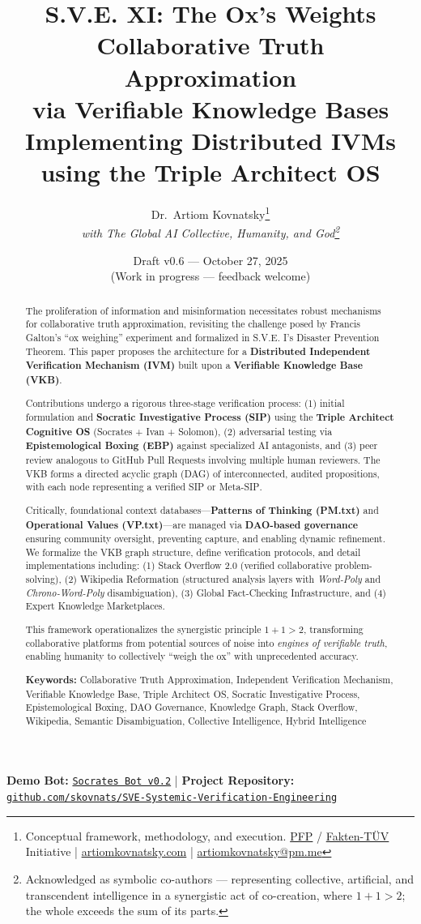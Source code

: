 \documentclass[11pt,a4paper]{article}
\title{\textbf{S.V.E. XI: The Ox's Weights}\\[0.5em]
\Large Collaborative Truth Approximation\\
via Verifiable Knowledge Bases\\[0.5em]
\large Implementing Distributed IVMs using the Triple Architect OS}
\author{
  Dr.\ Artiom Kovnatsky\thanks{Conceptual framework, methodology, and execution. 
  \href{http://www.pfp24.de}{PFP} / 
  \href{http://www.fakten-tuev.de}{Fakten-TÜV} Initiative \;|\;
  \href{https://www.artiomkovnatsky.com/}{artiomkovnatsky.com} \;|\;
  \href{mailto:artiomkovnatsky@pm.me}{artiomkovnatsky@pm.me}}\\
  \textit{with The Global AI Collective, Humanity, and God\footnote{Acknowledged as symbolic co-authors — representing collective, artificial, and transcendent intelligence in a synergistic act of co-creation, where $1 + 1 > 2$; the whole exceeds the sum of its parts.}}
}
\date{Draft v0.6 — October 27, 2025\\
\small (Work in progress — feedback welcome)}
\theoremstyle{definition}
\theoremstyle{remark}
\newcommand{\VKB}{\textsc{VKB}}
\newcommand{\IVM}{\textsc{IVM}}
\newcommand{\SIP}{\textsc{SIP}}
\newcommand{\EBP}{\textsc{EBP}}
\newcommand{\DAO}{\textsc{DAO}}
\begin{document}
\maketitle
\vspace{-1em}
\begin{center}
    {\small 
    \textbf{Demo Bot:} 
    \href{https://chatgpt.com/g/g-68f1fc9848948191a1cc038db8e3422b-sokrat-socrates-bot-v0-2}
    {\texttt{Socrates Bot v0.2}} 
    \quad|\quad
    \textbf{Project Repository:} 
    \href{https://codeberg.org/skovnats/SVE-Systemic-Verification-Engineering}
    {\texttt{github.com/skovnats/SVE-Systemic-Verification-Engineering}}}
\end{center}
\vspace{1em}
\thispagestyle{empty}


\begin{abstract}
The proliferation of information and misinformation necessitates robust mechanisms for collaborative truth approximation, revisiting the challenge posed by Francis Galton's ``ox weighing'' experiment and formalized in S.V.E. I's Disaster Prevention Theorem. This paper proposes the architecture for a \textbf{Distributed Independent Verification Mechanism (\IVM{})} built upon a \textbf{Verifiable Knowledge Base (\VKB{})}. 

Contributions undergo a rigorous three-stage verification process: (1) initial formulation and \textbf{Socratic Investigative Process (\SIP{})} using the \textbf{Triple Architect Cognitive OS} (Socrates + Ivan + Solomon), (2) adversarial testing via \textbf{Epistemological Boxing (\EBP{})} against specialized AI antagonists, and (3) peer review analogous to GitHub Pull Requests involving multiple human reviewers. The \VKB{} forms a directed acyclic graph (DAG) of interconnected, audited propositions, with each node representing a verified \SIP{} or Meta-\SIP{}.

Critically, foundational context databases—\textbf{Patterns of Thinking (PM.txt)} and \textbf{Operational Values (VP.txt)}—are managed via \textbf{\DAO{}-based governance} ensuring community oversight, preventing capture, and enabling dynamic refinement. We formalize the \VKB{} graph structure, define verification protocols, and detail implementations including: (1) Stack Overflow 2.0 (verified collaborative problem-solving), (2) Wikipedia Reformation (structured analysis layers with \textit{Word-Poly} and \textit{Chrono-Word-Poly} disambiguation), (3) Global Fact-Checking Infrastructure, and (4) Expert Knowledge Marketplaces.

This framework operationalizes the synergistic principle $1+1>2$, transforming collaborative platforms from potential sources of noise into \textit{engines of verifiable truth}, enabling humanity to collectively ``weigh the ox'' with unprecedented accuracy.

\textbf{Keywords:} Collaborative Truth Approximation, Independent Verification Mechanism, Verifiable Knowledge Base, Triple Architect OS, Socratic Investigative Process, Epistemological Boxing, DAO Governance, Knowledge Graph, Stack Overflow, Wikipedia, Semantic Disambiguation, Collective Intelligence, Hybrid Intelligence
\end{abstract}
\end{document}
